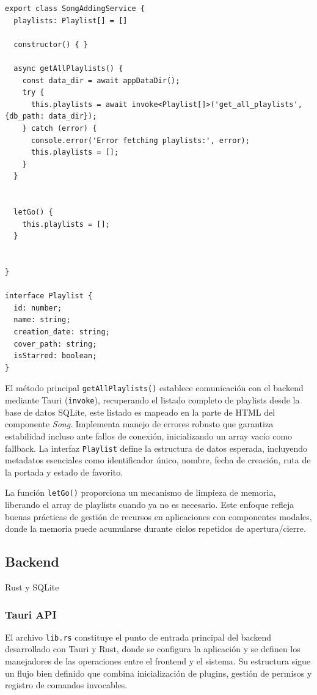 \documentclass[11pt, a4paper]{article}
\begin{document}
                \begin{lstlisting}[caption={song-adding.service.ts}]
export class SongAddingService {
  playlists: Playlist[] = []

  constructor() { }

  async getAllPlaylists() {
    const data_dir = await appDataDir();
    try {
      this.playlists = await invoke<Playlist[]>('get_all_playlists', {db_path: data_dir});
    } catch (error) {
      console.error('Error fetching playlists:', error);
      this.playlists = [];
    }
  }


  letGo() {
    this.playlists = [];
  }


}

interface Playlist {
  id: number;
  name: string;
  creation_date: string;
  cover_path: string;
  isStarred: boolean;
}
                \end{lstlisting}

                El método principal \verb|getAllPlaylists()| establece comunicación con el backend mediante Tauri (\verb|invoke|), recuperando el listado completo de playlists desde la base de datos SQLite, este listado es mapeado en la parte de HTML del componente \textit{Song}. Implementa manejo de errores robusto que garantiza estabilidad incluso ante fallos de conexión, inicializando un array vacío como fallback. La interfaz \verb|Playlist| define la estructura de datos esperada, incluyendo metadatos esenciales como identificador único, nombre, fecha de creación, ruta de la portada y estado de favorito.

                La función \verb|letGo()| proporciona un mecanismo de limpieza de memoria, liberando el array de playlists cuando ya no es necesario. Este enfoque refleja buenas prácticas de gestión de recursos en aplicaciones con componentes modales, donde la memoria puede acumularse durante ciclos repetidos de apertura/cierre.

        \subsection{Backend}

        Rust y SQLite

            \subsubsection{Tauri API}

            El archivo \verb|lib.rs| constituye el punto de entrada principal del backend desarrollado con Tauri y Rust, donde se configura la aplicación y se definen los manejadores de las operaciones entre el frontend y el sistema. Su estructura sigue un flujo bien definido que combina inicialización de plugins, gestión de permisos y registro de comandos invocables.
\end{document}
